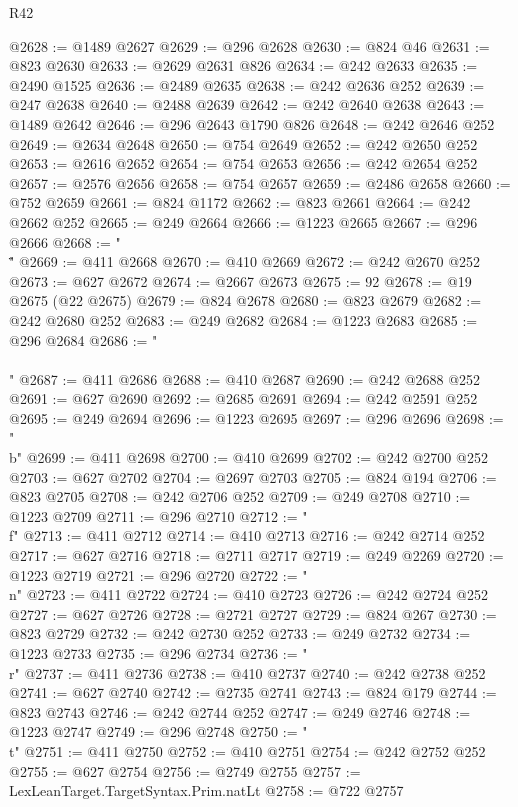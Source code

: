 \begin{lexlean}{R42}
\begin{coremodule}
{@2628 := @1489 @2627
@2629 := @296 @2628
@2630 := @824 @46
@2631 := @823 @2630
@2633 := @2629 @2631 @826
@2634 := @242 @2633
@2635 := @2490 @1525
@2636 := @2489 @2635
@2638 := @242 @2636 @252
@2639 := @247 @2638
@2640 := @2488 @2639
@2642 := @242 @2640 @2638
@2643 := @1489 @2642
@2646 := @296 @2643 @1790 @826
@2648 := @242 @2646 @252
@2649 := @2634 @2648
@2650 := @754 @2649
@2652 := @242 @2650 @252
@2653 := @2616 @2652
@2654 := @754 @2653
@2656 := @242 @2654 @252
@2657 := @2576 @2656
@2658 := @754 @2657
@2659 := @2486 @2658
@2660 := @752 @2659
@2661 := @824 @1172
@2662 := @823 @2661
@2664 := @242 @2662 @252
@2665 := @249 @2664
@2666 := @1223 @2665
@2667 := @296 @2666
@2668 := "\\\""
@2669 := @411 @2668
@2670 := @410 @2669
@2672 := @242 @2670 @252
@2673 := @627 @2672
@2674 := @2667 @2673
@2675 := 92
@2678 := @19 @2675 (@22 @2675)
@2679 := @824 @2678
@2680 := @823 @2679
@2682 := @242 @2680 @252
@2683 := @249 @2682
@2684 := @1223 @2683
@2685 := @296 @2684
@2686 := "\\\\"
@2687 := @411 @2686
@2688 := @410 @2687
@2690 := @242 @2688 @252
@2691 := @627 @2690
@2692 := @2685 @2691
@2694 := @242 @2591 @252
@2695 := @249 @2694
@2696 := @1223 @2695
@2697 := @296 @2696
@2698 := "\\b"
@2699 := @411 @2698
@2700 := @410 @2699
@2702 := @242 @2700 @252
@2703 := @627 @2702
@2704 := @2697 @2703
@2705 := @824 @194
@2706 := @823 @2705
@2708 := @242 @2706 @252
@2709 := @249 @2708
@2710 := @1223 @2709
@2711 := @296 @2710
@2712 := "\\f"
@2713 := @411 @2712
@2714 := @410 @2713
@2716 := @242 @2714 @252
@2717 := @627 @2716
@2718 := @2711 @2717
@2719 := @249 @2269
@2720 := @1223 @2719
@2721 := @296 @2720
@2722 := "\\n"
@2723 := @411 @2722
@2724 := @410 @2723
@2726 := @242 @2724 @252
@2727 := @627 @2726
@2728 := @2721 @2727
@2729 := @824 @267
@2730 := @823 @2729
@2732 := @242 @2730 @252
@2733 := @249 @2732
@2734 := @1223 @2733
@2735 := @296 @2734
@2736 := "\\r"
@2737 := @411 @2736
@2738 := @410 @2737
@2740 := @242 @2738 @252
@2741 := @627 @2740
@2742 := @2735 @2741
@2743 := @824 @179
@2744 := @823 @2743
@2746 := @242 @2744 @252
@2747 := @249 @2746
@2748 := @1223 @2747
@2749 := @296 @2748
@2750 := "\\t"
@2751 := @411 @2750
@2752 := @410 @2751
@2754 := @242 @2752 @252
@2755 := @627 @2754
@2756 := @2749 @2755
@2757 := LexLeanTarget.TargetSyntax.Prim.natLt
@2758 := @722 @2757
}
\end{coremodule}
\end{lexlean}
